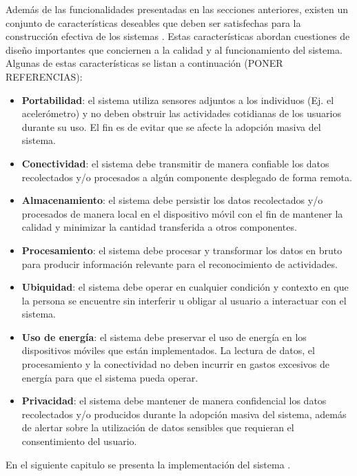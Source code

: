 \label{ssec46:caracteristicas}Además de las funcionalidades presentadas
en las secciones anteriores, existen un conjunto de características
deseables que deben ser satisfechas para la construcción efectiva
de los sistemas . Estas características abordan cuestiones
de diseño importantes que conciernen a la calidad y al funcionamiento
del sistema. Algunas de estas características se listan a continuación
(PONER REFERENCIAS):
\begin{itemize}
\item \textbf{Portabilidad}: el sistema utiliza sensores adjuntos a los
individuos (Ej. el acelerómetro) y no deben obstruir las actividades
cotidianas de los usuarios durante su uso. El fin es de evitar que
se afecte la adopción masiva del sistema. 
\item \textbf{Conectividad}: el sistema debe transmitir de manera confiable
los datos recolectados y/o procesados a algún componente desplegado
de forma remota. 
\item \textbf{Almacenamiento}: el sistema debe persistir los datos recolectados
y/o procesados de manera local en el dispositivo móvil con el fin
de mantener la calidad y minimizar la cantidad transferida a otros
componentes.
\item \textbf{Procesamiento}: el sistema debe procesar y transformar los
datos en bruto para producir información relevante para el reconocimiento
de actividades.
\item \textbf{Ubiquidad}: el sistema debe operar en cualquier condición
y contexto en que la persona se encuentre sin interferir u obligar
al usuario a interactuar con el sistema.
\item \textbf{Uso de energía}: el sistema debe preservar el uso de energía
en los dispositivos móviles que están implementados. La lectura de
datos, el procesamiento y la conectividad no deben incurrir en gastos
excesivos de energía para que el sistema pueda operar.
\item \textbf{Privacidad}: el sistema debe mantener de manera confidencial
los datos recolectados y/o producidos durante la adopción masiva del
sistema, además de alertar sobre la utilización de datos sensibles
que requieran el consentimiento del usuario.
\end{itemize}
En el siguiente capitulo se presenta la implementación del sistema
.
